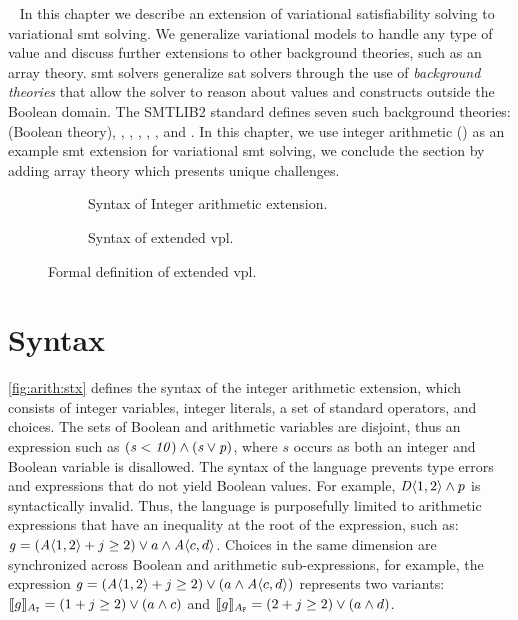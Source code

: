 ~\label{chapter:vsmt}
%
In this chapter we describe an extension of variational satisfiability solving
to variational \ac{smt} solving.
We generalize variational models to handle any type of value and discuss
further extensions to other background theories, such as an array theory.
\ac{smt} solvers generalize \ac{sat} solvers through the use of \emph{background
  theories} that allow the solver to reason about values and constructs outside
the Boolean domain. The SMTLIB2 standard defines seven such background theories:
 (Boolean theory), , ,
, , , and .
In this chapter, we use integer arithmetic () as an example
\ac{smt} extension for variational \ac{smt} solving, we conclude the section by
adding array theory which presents unique challenges.

\begin{figure}
  \begin{subfigure}[t]{\linewidth}
    \centering
    
    \caption{Syntax of Integer arithmetic extension.}%
    \label{fig:arith:stx}
  \end{subfigure}
  \begin{subfigure}[t]{\linewidth}
    
    \centering
    \caption{Syntax of extended \ac{vpl}.}%
    \label{fig:arith:vpl}
  \end{subfigure}
  \caption{Formal definition of extended \ac{vpl}.}%
  \label{fig:ex:vpl}
\end{figure}

\section{Syntax}
%
\autoref{fig:arith:stx} defines the syntax of the integer arithmetic extension,
which consists of integer variables, integer literals, a set of standard
operators, and choices.
%
The sets of Boolean and arithmetic variables are disjoint, thus an expression
such as $(\mathit{s < 10) \wedge (s \vee p})$, where $s$ occurs as both an integer
and Boolean variable is disallowed.
%
The syntax of the language prevents type errors and expressions that do not
yield Boolean values. For example, $\chc[D]{1,2} \wedge p$ is syntactically
invalid.
%
Thus, the language is purposefully limited to arithmetic expressions that
have an inequality at the root of the expression, such as: $\kf{g} =
(\chc[A]{1, 2} + j \geq 2) \vee a \wedge \chc[A]{c, d}$.
%
Choices in the same dimension are synchronized across Boolean and arithmetic
sub-expressions, for example, the expression
%
$\kf{g} = (\chc[A]{1, 2} + j \geq 2) \vee (a \wedge \chc[A]{c,d})$
represents two variants:
%
$\sem[A_{\tru{}}]{g} = (1 + j \geq 2) \vee (a \wedge c)$ and
$\sem[A_{\fls{}}]{g} = (2 + j \geq 2) \vee (a \wedge d)$.

